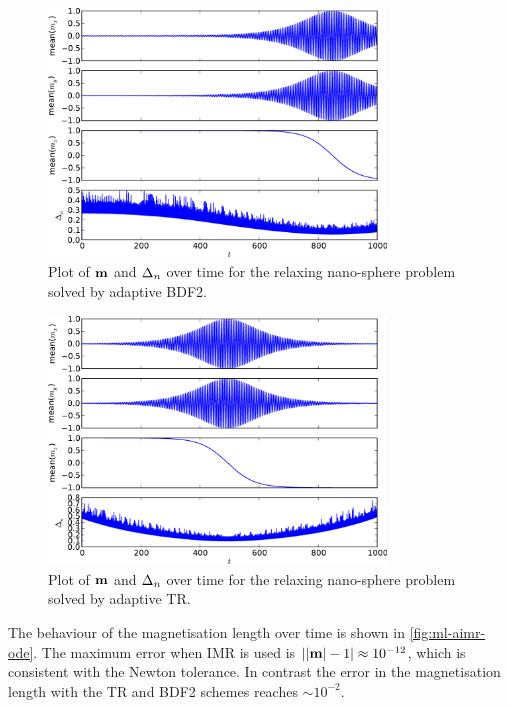 \begin{figure}
  \centering
  \includegraphics[width=0.8\textwidth]{plots/aimr-sphere-relax/bdf21-meanmxsvs-meanmysvs-meanmzsvs-dtsvstimes.pdf}
  \caption{Plot of $\boldsymbol{\mathrm{m}}$ and $\Delta_{n}$ over time for the relaxing nano-sphere problem solved by adaptive BDF2.}
  \label{fig:bdf2-llg-ode}
\end{figure}


\begin{figure}
  \centering
  \includegraphics[width=0.8\textwidth]{plots/aimr-sphere-relax/tr1-meanmxsvs-meanmysvs-meanmzsvs-dtsvstimes.pdf}
  \caption{Plot of $\boldsymbol{\mathrm{m}}$ and $\Delta_{n}$ over time for the relaxing nano-sphere problem solved by adaptive TR.}
  \label{fig:tr-llg-ode}
\end{figure}

The behaviour of the magnetisation length over time is shown in \cref{fig:ml-aimr-ode}.
The maximum error when IMR is used is $\left|{\left|{\boldsymbol{\mathrm{m}}} \right| -1} \right| \approx 10^{-12}$, which is consistent with the Newton tolerance.
In contrast the error in the magnetisation length with the TR and BDF2 schemes reaches $\sim 10^{-2}$.


